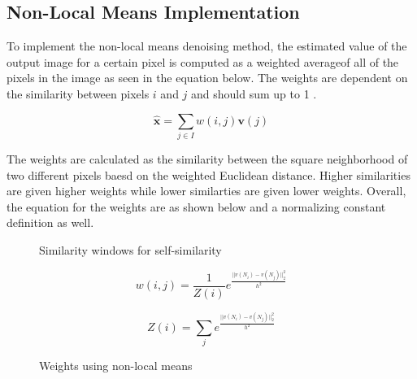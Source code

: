 \documentclass[conference]{IEEEtran}
\begin{document}
\subsection{Non-Local Means Implementation}
To implement the non-local means denoising method, the estimated value of the output image for a certain pixel is computed as a weighted averageof all of the pixels in the image
as seen in the equation below. The weights are dependent on the similarity between pixels $i$ and $j$ and should sum up to 1 \cite{source}.

\begin{equation}
    \mathbf{\hat{x}} = \sum_{j \in I}w(i,j)\mathbf{v}(j)
\end{equation}

The weights are calculated as the similarity between the square neighborhood of two different pixels baesd on the weighted Euclidean distance.
Higher similarities are given higher weights while lower similarties are given lower weights. Overall, the equation for the weights are as shown below and a normalizing constant definition
as well.

\begin{figure}[htbp]
    \centering
    \caption{Similarity windows for self-similarity \cite{review}}
\end{figure}

\begin{equation}
    w(i,j) = \frac{1}{Z(i)}e^{\frac{||v(N_i)-v(N_j)||_2^2}{h^2}}
\end{equation}

\begin{equation}
    Z(i) = \sum_{j} e^{\frac{||v(N_i)-v(N_j)||_2^2}{h^2}}
\end{equation}

\begin{figure}[htbp]
    \centering
    \caption{Weights using non-local means \cite{source}}
\end{figure}
\end{document}
